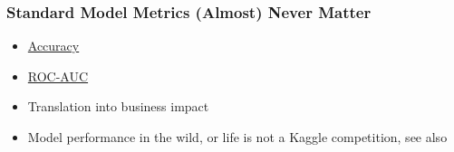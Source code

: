 \begin{frame}
\frametitle{Standard Model Metrics (Almost) Never Matter}

\begin{itemize}
    \item \href{https://scikit-learn.org/stable/modules/generated/sklearn.metrics.accuracy\_score.html}{Accuracy} \cite{aletras2016predicting, echr-2}
    \item \href{https://scikit-learn.org/stable/modules/generated/sklearn.metrics.roc\_auc\_score.html\#sklearn.metrics.roc\_auc\_score}{ROC-AUC}
    \item Translation into business impact
    \item Model performance in the wild, or life is not a Kaggle competition, see also \cite{rendle2019difficulty}\newline
\end{itemize}


\end{frame}
